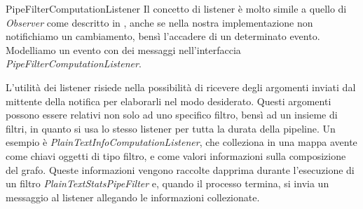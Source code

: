 \begin{paragraph}{PipeFilterComputationListener}
  Il concetto di listener \`e molto simile a quello di \emph{Observer}
  come descritto in \cite{SmalltalkCompanion98}, anche se nella nostra
  implementazione non notifichiamo un cambiamento, bens\`i l'accadere
  di un determinato evento. Modelliamo un evento con dei messaggi
  nell'interfaccia \emph{PipeFilterComputationListener}.

  L'utilit\`a dei listener risiede nella possibilit\`a di ricevere
  degli argomenti inviati dal mittente della notifica per elaborarli
  nel modo desiderato. Questi argomenti possono essere relativi non
  solo ad uno specifico filtro, bens\`i ad un insieme di filtri, in
  quanto si usa lo stesso listener per tutta la durata della
  pipeline. Un esempio \`e \emph{PlainTextInfoComputationListener},
  che colleziona in una mappa avente come chiavi oggetti di tipo
  filtro, e come valori informazioni sulla composizione del
  grafo. Queste informazioni vengono raccolte dapprima durante
  l'esecuzione di un filtro \emph{PlainTextStatsPipeFilter} e, quando
  il processo termina, si invia un messaggio al listener allegando le
  informazioni collezionate.
\end{paragraph}

